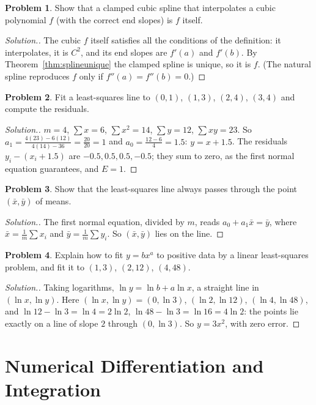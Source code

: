 \documentclass[11pt,a4paper]{article}
\numberwithin{equation}{section}
\theoremstyle{definition}
\newtheorem{problemx}{Problem}[subsection]
\newenvironment{problem}{\begin{problemx}}{\end{problemx}}
\newenvironment{solution}
  {\renewcommand{\qedsymbol}{}\begin{proof}[\textit{Solution}.]}
  {\end{proof}}
\begin{document}
\begin{problem}
Show that a clamped cubic spline that interpolates a cubic polynomial $f$ (with the correct end slopes) is $f$ itself.
\end{problem}
\begin{solution}
The cubic $f$ itself satisfies all the conditions of the definition: it interpolates, it is $C^2$, and its end slopes are $f'(a)$ and $f'(b)$. By
Theorem~\ref{thm:splineunique} the clamped spline is unique, so it is $f$. (The natural spline reproduces $f$ only if $f''(a) = f''(b) = 0$.)
\end{solution}

\begin{problem}
Fit a least-squares line to $(0,1)$, $(1,3)$, $(2,4)$, $(3,4)$ and compute the residuals.
\end{problem}
\begin{solution}
$m = 4$, $\sum x = 6$, $\sum x^2 = 14$, $\sum y = 12$, $\sum xy = 23$. So $a_1 = \frac{4(23)-6(12)}{4(14)-36} = \frac{20}{20} = 1$ and $a_0 = \frac{12-6}{4} = 1.5$:
$y = x+1.5$. The residuals $y_i-(x_i+1.5)$ are $-0.5, 0.5, 0.5, -0.5$; they sum to zero, as the first normal equation guarantees, and $E = 1$.
\end{solution}

\begin{problem}
Show that the least-squares line always passes through the point $(\bar x,\bar y)$ of means.
\end{problem}
\begin{solution}
The first normal equation, divided by $m$, reads $a_0+a_1\bar x = \bar y$, where $\bar x = \frac1m\sum x_i$ and $\bar y = \frac1m\sum y_i$. So
$(\bar x,\bar y)$ lies on the line.
\end{solution}

\begin{problem}
Explain how to fit $y = bx^a$ to positive data by a linear least-squares problem, and fit it to $(1,3)$, $(2,12)$, $(4,48)$.
\end{problem}
\begin{solution}
Taking logarithms, $\ln y = \ln b+a\ln x$, a straight line in $(\ln x,\ln y)$. Here $(\ln x,\ln y) = (0,\ln3)$, $(\ln2,\ln12)$, $(\ln4,\ln48)$, and
$\ln12-\ln3 = \ln4 = 2\ln2$, $\ln48-\ln3 = \ln16 = 4\ln2$: the points lie exactly on a line of slope $2$ through $(0,\ln3)$. So $y = 3x^2$, with
zero error.
\end{solution}


\section{Numerical Differentiation and Integration}
\label{sec:diffint}
\end{document}
